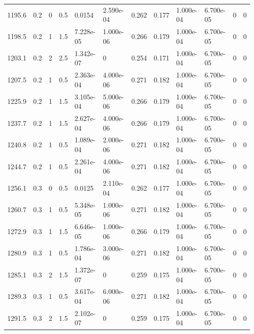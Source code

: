 \documentclass[preview]{standalone}
\begin{document}
{{{\begin{tabular}{L{1.2cm}C{1.2cm} C{0.3cm}C{0.5cm} C{1.4cm}C{1.4cm} C{1.4cm}C{1.4cm} C{1.6cm}C{1.6cm} C{1.6cm}C{1.6cm}}
  1195.6  &   0.2  & 0     & 0.5 &  0.0154  & 2.590e-04  &  0.262&   0.177& 1.000e-04 & 6.700e-05   &  0 & 0  \\ 
  1198.5  &   0.2  & 1     & 1.5 &  7.228e-05  & 1.000e-06  &  0.266&   0.179& 1.000e-04 & 6.700e-05   &  0 & 0  \\ 
  1203.1  &   0.2  & 2     & 2.5 &  1.342e-07  & 0  &  0.254&   0.171& 1.000e-04 & 6.700e-05   &  0 & 0  \\ 
  1207.5  &   0.2  & 1     & 0.5 &  2.363e-04  & 4.000e-06  &  0.271&   0.182& 1.000e-04 & 6.700e-05   &  0 & 0  \\ 
  1225.9  &   0.2  & 1     & 1.5 &  3.105e-04  & 5.000e-06  &  0.266&   0.179& 1.000e-04 & 6.700e-05   &  0 & 0  \\ 
  1237.7  &   0.2  & 1     & 1.5 &  2.627e-04  & 4.000e-06  &  0.266&   0.179& 1.000e-04 & 6.700e-05   &  0 & 0  \\ 
  1240.8  &   0.2  & 1     & 0.5 &  1.089e-04  & 2.000e-06  &  0.271&   0.182& 1.000e-04 & 6.700e-05   &  0 & 0  \\ 
  1244.7  &   0.2  & 1     & 0.5 &  2.261e-04  & 4.000e-06  &  0.271&   0.182& 1.000e-04 & 6.700e-05   &  0 & 0  \\ 
  1256.1  &   0.3  & 0     & 0.5 &  0.0125  & 2.110e-04  &  0.262&   0.177& 1.000e-04 & 6.700e-05   &  0 & 0  \\ 
  1260.7  &   0.3  & 1     & 0.5 &  5.348e-05  & 1.000e-06  &  0.271&   0.182& 1.000e-04 & 6.700e-05   &  0 & 0  \\ 
  1272.9  &   0.3  & 1     & 1.5 &  6.646e-05  & 1.000e-06  &  0.266&   0.179& 1.000e-04 & 6.700e-05   &  0 & 0  \\ 
  1280.9  &   0.3  & 1     & 0.5 &  1.786e-04  & 3.000e-06  &  0.271&   0.182& 1.000e-04 & 6.700e-05   &  0 & 0  \\ 
  1285.1  &   0.3  & 2     & 1.5 &  1.372e-07  & 0  &  0.259&   0.175& 1.000e-04 & 6.700e-05   &  0 & 0  \\ 
  1289.3  &   0.3  & 1     & 0.5 &  3.617e-04  & 6.000e-06  &  0.271&   0.182& 1.000e-04 & 6.700e-05   &  0 & 0  \\ 
  1291.5  &   0.3  & 2     & 1.5 &  2.102e-07  & 0  &  0.259&   0.175& 1.000e-04 & 6.700e-05   &  0 & 0  \\ 
\hline 
\end{tabular} 

}}}
\end{document}

